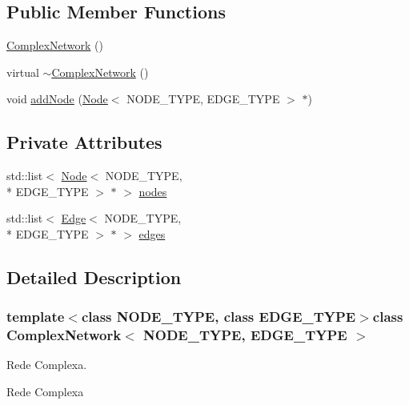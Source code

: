 \subsection*{Public Member Functions}
\begin{DoxyCompactItemize}
\item 
\hyperlink{class_complex_network_a8e33a5505e7a856076cd7d982a165348}{Complex\+Network} ()
\item 
virtual \hyperlink{class_complex_network_a266ec2df18b6408115ebd48f0cee9454}{$\sim$\+Complex\+Network} ()
\item 
void \hyperlink{class_complex_network_a3e537a20ea5443faa9b4c8836615dad4}{add\+Node} (\hyperlink{class_node}{Node}$<$ N\+O\+D\+E\+\_\+\+T\+Y\+P\+E, E\+D\+G\+E\+\_\+\+T\+Y\+P\+E $>$ $\ast$)
\end{DoxyCompactItemize}
\subsection*{Private Attributes}
\begin{DoxyCompactItemize}
\item 
std\+::list$<$ \hyperlink{class_node}{Node}$<$ N\+O\+D\+E\+\_\+\+T\+Y\+P\+E, \\*
E\+D\+G\+E\+\_\+\+T\+Y\+P\+E $>$ $\ast$ $>$ \hyperlink{class_complex_network_a03230eb6662d7d14b10e5ead9d5dea35}{nodes}
\item 
std\+::list$<$ \hyperlink{class_edge}{Edge}$<$ N\+O\+D\+E\+\_\+\+T\+Y\+P\+E, \\*
E\+D\+G\+E\+\_\+\+T\+Y\+P\+E $>$ $\ast$ $>$ \hyperlink{class_complex_network_a7241d134d1dc4a4bfb21144fb0fa5520}{edges}
\end{DoxyCompactItemize}


\subsection{Detailed Description}
\subsubsection*{template$<$class N\+O\+D\+E\+\_\+\+T\+Y\+P\+E, class E\+D\+G\+E\+\_\+\+T\+Y\+P\+E$>$class Complex\+Network$<$ N\+O\+D\+E\+\_\+\+T\+Y\+P\+E, E\+D\+G\+E\+\_\+\+T\+Y\+P\+E $>$}

Rede Complexa. 

Rede Complexa 

